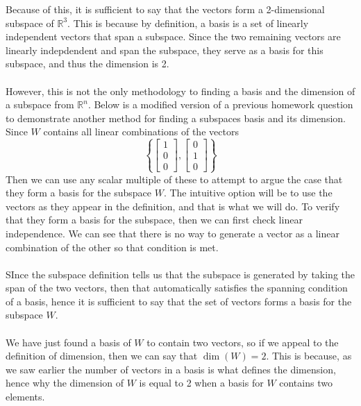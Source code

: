 \documentclass{report}
\begin{document}
Because of this, it is sufficient to say that the vectors form a 2-dimensional subspace of $\mathbb{R}^3$. This is because by definition, a basis is a set of linearly independent vectors that span a subspace. Since the two remaining vectors are linearly indepdendent and span the subspace, they serve as a basis for this subspace, and thus the dimension is 2. \\
\\
\noindent However,  this is not the only methodology to finding a basis and the dimension of a subspace from $\mathbb{R}^n$.  Below is a modified version of a previous homework question to demonstrate another method for finding a subspaces basis and its dimension.
\sol Since $W$ contains all linear combinations of the vectors
$$
\left\{\begin{bmatrix} 1\\0\\0 \end{bmatrix},\begin{bmatrix} 0\\1\\0 \end{bmatrix}\right\}
$$
Then we can use any scalar multiple of these to attempt to argue the case that they form a basis for the subspace $W$.  The intuitive option will be to use the vectors as they appear in the definition,  and that is what we will do.  To verify that they form a basis for the subspace,  then we can first check linear independence.  We can see that there is no way to generate a vector as a linear combination of the other so that condition is met. \\
\\
\noindent SInce the subspace definition tells us that the subspace is generated by taking the span of the two vectors,  then that automatically satisfies the spanning condition of a basis,  hence it is sufficient to say that the set of vectors forms a basis for the subspace $W$.\\
\\
\noindent We have just found a basis of $W$ to contain two vectors,  so if we appeal to the definition of dimension, then we can say that $\dim(W)=2$.  This is because,  as we saw earlier the number of vectors in a basis is what defines the dimension,  hence why the dimension of $W$ is equal to 2 when a basis for $W$ contains two elements.
\end{document}
